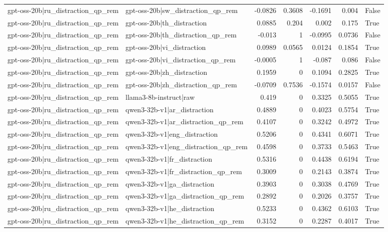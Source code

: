 \begin{table}
\begin{tabular}{l l r r r r l}
gpt-oss-20b|ru_distraction_qp_rem & gpt-oss-20b|sw_distraction_qp_rem & -0.0826 & 0.3608 & -0.1691 & 0.004 & False \\
gpt-oss-20b|ru_distraction_qp_rem & gpt-oss-20b|th_distraction & 0.0885 & 0.204 & 0.002 & 0.175 & True \\
gpt-oss-20b|ru_distraction_qp_rem & gpt-oss-20b|th_distraction_qp_rem & -0.013 & 1 & -0.0995 & 0.0736 & False \\
gpt-oss-20b|ru_distraction_qp_rem & gpt-oss-20b|vi_distraction & 0.0989 & 0.0565 & 0.0124 & 0.1854 & True \\
gpt-oss-20b|ru_distraction_qp_rem & gpt-oss-20b|vi_distraction_qp_rem & -0.0005 & 1 & -0.087 & 0.086 & False \\
gpt-oss-20b|ru_distraction_qp_rem & gpt-oss-20b|zh_distraction & 0.1959 & 0 & 0.1094 & 0.2825 & True \\
gpt-oss-20b|ru_distraction_qp_rem & gpt-oss-20b|zh_distraction_qp_rem & -0.0709 & 0.7536 & -0.1574 & 0.0157 & False \\
gpt-oss-20b|ru_distraction_qp_rem & llama3-8b-instruct|raw & 0.419 & 0 & 0.3325 & 0.5055 & True \\
gpt-oss-20b|ru_distraction_qp_rem & qwen3-32b-v1|ar_distraction & 0.4889 & 0 & 0.4023 & 0.5754 & True \\
gpt-oss-20b|ru_distraction_qp_rem & qwen3-32b-v1|ar_distraction_qp_rem & 0.4107 & 0 & 0.3242 & 0.4972 & True \\
gpt-oss-20b|ru_distraction_qp_rem & qwen3-32b-v1|eng_distraction & 0.5206 & 0 & 0.4341 & 0.6071 & True \\
gpt-oss-20b|ru_distraction_qp_rem & qwen3-32b-v1|eng_distraction_qp_rem & 0.4598 & 0 & 0.3733 & 0.5463 & True \\
gpt-oss-20b|ru_distraction_qp_rem & qwen3-32b-v1|fr_distraction & 0.5316 & 0 & 0.4438 & 0.6194 & True \\
gpt-oss-20b|ru_distraction_qp_rem & qwen3-32b-v1|fr_distraction_qp_rem & 0.3009 & 0 & 0.2143 & 0.3874 & True \\
gpt-oss-20b|ru_distraction_qp_rem & qwen3-32b-v1|ga_distraction & 0.3903 & 0 & 0.3038 & 0.4769 & True \\
gpt-oss-20b|ru_distraction_qp_rem & qwen3-32b-v1|ga_distraction_qp_rem & 0.2892 & 0 & 0.2026 & 0.3757 & True \\
gpt-oss-20b|ru_distraction_qp_rem & qwen3-32b-v1|he_distraction & 0.5233 & 0 & 0.4362 & 0.6103 & True \\
gpt-oss-20b|ru_distraction_qp_rem & qwen3-32b-v1|he_distraction_qp_rem & 0.3152 & 0 & 0.2287 & 0.4017 & True \\

\end{tabular}
\end{table}
